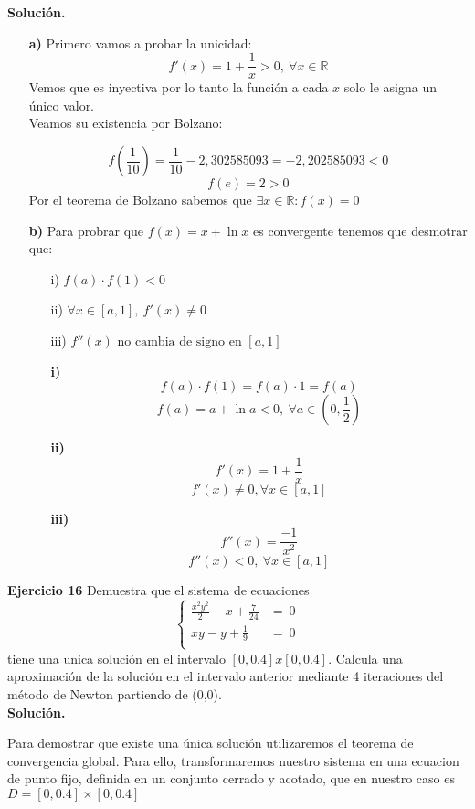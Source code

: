\documentclass[11pt]{article}
\begin{document}
\textbf{Soluci\'on.}
\begin{itemize}
\item[\textbf{a)}]
Primero vamos a probar la unicidad:
$$f'(x) = 1 + \frac{1}{x} > 0 ,\ \forall x \in \mathbb{R} $$
Vemos que es inyectiva por lo tanto la funci\'on a cada $x$ solo le asigna un \'unico valor. \\
Veamos su existencia por Bolzano:

$$f(\frac{1}{10}) = \frac{1}{10} - 2,302585093 = - 2,202585093 < 0$$
$$f(e) = 2 > 0$$
Por el teorema de Bolzano sabemos que $\exists x \in \mathbb{R} : f(x) = 0$
\item[\textbf{b)}]
Para probrar que $f(x) = x + \ln x$ es convergente tenemos que desmotrar que:
\begin{itemize}
\item[i)]$f(a) \cdot f(1) < 0$
\item[ii)]$\forall x \in [a,1], \ f'(x) \neq 0 $
\item[iii)]$f''(x) \text{ no cambia de signo en } [a,1] $
\end{itemize}

\begin{itemize}
\item[\textbf{i)}]
$$f(a) \cdot f(1) = f(a) \cdot 1 = f(a) $$
$$f(a) = a + \ln a < 0 , \  \forall a \in (0, \frac{1}{2}) $$
\item[\textbf{ii)}]
$$f'(x) = 1 + \frac{1}{x} $$
$$f'(x) \neq 0 , \forall x \in [a,1] $$
\item[\textbf{iii)}]
$$f''(x) = \frac{-1}{x^2} $$
$$f''(x) < 0 , \ \forall x \in [a,1] $$
\end{itemize}
\end{itemize}

\textbf{Ejercicio 16}
Demuestra que el sistema de ecuaciones
$$\begin{cases}
\frac{x^2y^2}{2} - x + \frac{7}{24} &= \ 0 \\
xy - y + \frac{1}{9} &= \ 0\\
\end{cases}$$
tiene una unica soluci\'on en el intervalo $[0, 0.4]x[0, 0.4]$. Calcula una aproximaci\'on de la soluci\'on en el intervalo anterior mediante 4 iteraciones del m\'etodo de Newton partiendo de (0,0).
\\

\textbf{Solución.}

Para demostrar que existe una única solución utilizaremos el teorema de
convergencia global. Para ello, transformaremos nuestro sistema en una ecuacion
de punto fijo, definida en un conjunto cerrado y acotado, que en nuestro caso
es $D = [0,0.4]\times[0,0.4]$
\end{document}
